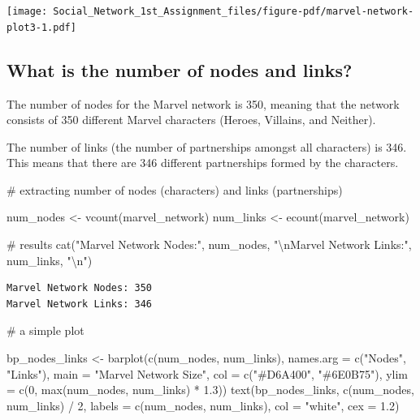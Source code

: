 \documentclass[
  letterpaper,
  DIV=11,
  numbers=noendperiod]{scrartcl}
\newenvironment{Shaded}{\begin{snugshade}}{\end{snugshade}}
\newcommand{\AttributeTok}[1]{\textcolor[rgb]{0.40,0.45,0.13}{#1}}
\newcommand{\CommentTok}[1]{\textcolor[rgb]{0.37,0.37,0.37}{#1}}
\newcommand{\DecValTok}[1]{\textcolor[rgb]{0.68,0.00,0.00}{#1}}
\newcommand{\FloatTok}[1]{\textcolor[rgb]{0.68,0.00,0.00}{#1}}
\newcommand{\FunctionTok}[1]{\textcolor[rgb]{0.28,0.35,0.67}{#1}}
\newcommand{\NormalTok}[1]{\textcolor[rgb]{0.00,0.23,0.31}{#1}}
\newcommand{\OtherTok}[1]{\textcolor[rgb]{0.00,0.23,0.31}{#1}}
\newcommand{\SpecialCharTok}[1]{\textcolor[rgb]{0.37,0.37,0.37}{#1}}
\newcommand{\StringTok}[1]{\textcolor[rgb]{0.13,0.47,0.30}{#1}}
\begin{document}
\texttt{[image: Social\_Network\_1st\_Assignment\_files/figure-pdf/marvel-network-plot3-1.pdf]}

\subsection{What is the number of nodes and
links?}\label{what-is-the-number-of-nodes-and-links}

The number of nodes for the Marvel network is 350, meaning that the
network consists of 350 different Marvel characters (Heroes, Villains,
and Neither).

The number of links (the number of partnerships amongst all characters)
is 346. This means that there are 346 different partnerships formed by
the characters.

\begin{Shaded}
\begin{Highlighting}[]
\CommentTok{\# extracting number of nodes (characters) and links (partnerships)}

\NormalTok{num\_nodes }\OtherTok{\textless{}{-}} \FunctionTok{vcount}\NormalTok{(marvel\_network)}
\NormalTok{num\_links }\OtherTok{\textless{}{-}} \FunctionTok{ecount}\NormalTok{(marvel\_network)}

\CommentTok{\# results}
\FunctionTok{cat}\NormalTok{(}\StringTok{"Marvel Network Nodes:"}\NormalTok{, num\_nodes,}
    \StringTok{"}\SpecialCharTok{\textbackslash{}n}\StringTok{Marvel Network Links:"}\NormalTok{, num\_links, }\StringTok{"}\SpecialCharTok{\textbackslash{}n}\StringTok{"}\NormalTok{)}
\end{Highlighting}
\end{Shaded}

\begin{verbatim}
Marvel Network Nodes: 350 
Marvel Network Links: 346 
\end{verbatim}

\begin{Shaded}
\begin{Highlighting}[]
\CommentTok{\# a simple plot}

\NormalTok{bp\_nodes\_links }\OtherTok{\textless{}{-}} \FunctionTok{barplot}\NormalTok{(}\FunctionTok{c}\NormalTok{(num\_nodes, num\_links), }
              \AttributeTok{names.arg =} \FunctionTok{c}\NormalTok{(}\StringTok{"Nodes"}\NormalTok{, }\StringTok{"Links"}\NormalTok{), }
              \AttributeTok{main =} \StringTok{"Marvel Network Size"}\NormalTok{, }
              \AttributeTok{col =} \FunctionTok{c}\NormalTok{(}\StringTok{"\#D6A400"}\NormalTok{, }\StringTok{"\#6E0B75"}\NormalTok{),  }
              \AttributeTok{ylim =} \FunctionTok{c}\NormalTok{(}\DecValTok{0}\NormalTok{, }\FunctionTok{max}\NormalTok{(num\_nodes, num\_links) }\SpecialCharTok{*} \FloatTok{1.3}\NormalTok{))  }
\FunctionTok{text}\NormalTok{(bp\_nodes\_links, }\FunctionTok{c}\NormalTok{(num\_nodes, num\_links) }\SpecialCharTok{/} \DecValTok{2}\NormalTok{,  }
     \AttributeTok{labels =} \FunctionTok{c}\NormalTok{(num\_nodes, num\_links), }\AttributeTok{col =} \StringTok{"white"}\NormalTok{, }\AttributeTok{cex =} \FloatTok{1.2}\NormalTok{)}
\end{Highlighting}
\end{Shaded}
\end{document}
